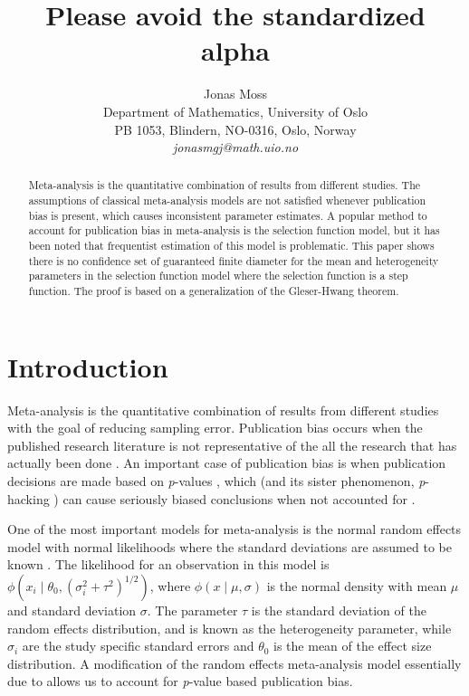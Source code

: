 \documentclass{article}
\title{Please avoid the standardized alpha}
\author{
  Jonas Moss \\
  Department of Mathematics, University of Oslo\\
  PB 1053, Blindern, NO-0316, Oslo, Norway \\
  \it{jonasmgj@math.uio.no}
}
\theoremstyle{plain}
\theoremstyle{plain}
\theoremstyle{definition}
\theoremstyle{remark}
\theoremstyle{definition}
\theoremstyle{plain}
\theoremstyle{plain}
\theoremstyle{definition}
\begin{document}
\maketitle
\begin{abstract}
Meta-analysis is the quantitative combination of results from different studies. The assumptions of classical meta-analysis models are not satisfied whenever publication bias is present, which causes inconsistent parameter estimates. A popular method to account for publication bias in meta-analysis is the selection function model, but it has been noted that frequentist estimation of this model is problematic. This paper shows there is no confidence set of guaranteed finite diameter for the mean and heterogeneity parameters in the selection function model where the selection function is a step function. The proof is based on a generalization of the Gleser-Hwang theorem.
\end{abstract}

\section{Introduction}

Meta-analysis is the quantitative combination of results from different studies \citep{lipsey2001practical} with the goal of reducing sampling error.
Publication bias occurs when the published research literature is
not representative of the all the research that has actually been
done \citep{rothstein2006publication}. An important case of publication
bias is when publication decisions are made based on \emph{p}-values
\citep{sterling1959publication}, which (and its sister phenomenon, \emph{p}-hacking \citep{simmons2011false})
can cause seriously biased conclusions when not accounted
for \citep{simmons2011false,moss2019modelling}.

One of the most important models for meta-analysis is the normal random effects
model with normal likelihoods where the
standard deviations are assumed to be known \citep{hedges1998fixed}.
The likelihood for an observation in this model is $\phi(x_{i}\mid\theta_{0},(\sigma_{i}^{2}+\tau^{2})^{1/2})$,
where $\phi(x\mid\mu,\sigma)$ is the normal density with
mean $\mu$ and standard deviation $\sigma$. The parameter $\tau$ is the standard deviation of the random effects distribution, and is known as the heterogeneity parameter, while $\sigma_i$ are the study specific standard errors and $\theta_0$ is the mean of the effect size distribution. A modification of the random
effects meta-analysis model essentially due to \citet{hedges1984estimation}
allows us to account for \emph{p}-value based publication bias.
\end{document}
